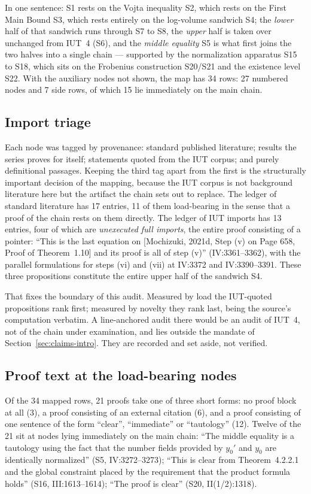 \documentclass[11pt,a4paper]{article}
\theoremstyle{definition}
\theoremstyle{remark}
\begin{document}
In one sentence: S1 rests on the Vojta inequality S2, which rests on the First
Main Bound S3, which rests entirely on the log-volume sandwich S4; the
\emph{lower} half of that sandwich runs through S7 to S8, the \emph{upper} half is
taken over unchanged from IUT~4 (S6), and the \emph{middle equality} S5 is what
first joins the two halves into a single chain --- supported by the normalization
apparatus S15 to S18, which sits on the Frobenius construction S20/S21 and the
existence level S22. With the auxiliary nodes not shown, the map has 34 rows: 27
numbered nodes and 7 side rows, of which 15 lie immediately on the main chain.

\subsection{Import triage}

Each node was tagged by provenance: standard published literature; results the
series proves for itself; statements quoted from the IUT corpus; and purely
definitional passages. Keeping the third tag apart from the first is the
structurally important decision of the mapping, because the IUT corpus is not
background literature here but the artifact the chain sets out to replace. The
ledger of standard literature has 17 entries, 11 of them load-bearing in the sense
that a proof of the chain rests on them directly. The ledger of IUT imports has 13
entries, four of which are \emph{unexecuted full imports}, the entire proof
consisting of a pointer: ``This is the last equation on [Mochizuki, 2021d, Step
(v) on Page 658, Proof of Theorem~1.10] and its proof is all of step (v)''
(IV:3361--3362), with the parallel formulations for steps (vi) and (vii) at
IV:3372 and IV:3390--3391. These three propositions constitute the entire upper
half of the sandwich S4.

That fixes the boundary of this audit. Measured by load the IUT-quoted
propositions rank first; measured by novelty they rank last, being the source's
computation verbatim. A line-anchored audit there would be an audit of IUT~4, not
of the chain under examination, and lies outside the mandate of
Section~\ref{sec:claims-intro}. They are recorded and set aside, not verified.

\subsection{Proof text at the load-bearing nodes}

Of the 34 mapped rows, 21 proofs take one of three short forms: no proof block at
all (3), a proof consisting of an external citation (6), and a proof consisting of
one sentence of the form ``clear'', ``immediate'' or ``tautology'' (12). Twelve of
the 21 sit at nodes lying immediately on the main chain: ``The middle equality is
a tautology using the fact that the number fields provided by $y_0'$ and $y_0$ are
identically normalized'' (S5, IV:3272--3273); ``This is clear from
Theorem~4.2.2.1 and the global constraint placed by the requirement that the
product formula holds'' (S16, III:1613--1614); ``The proof is clear'' (S20,
II(1/2):1318).
\end{document}
